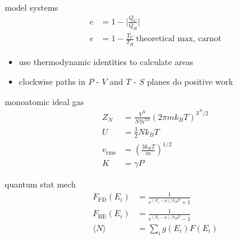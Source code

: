 \documentclass[avery5388, frame, grid]{flashcards}
\begin{document}
\begin{flashcard}{model systems}
  {
    \begin{align*}
      e &= 1 - \lvert \frac{Q_{C}}{Q_{H}} \rvert\\
      e &= 1 - \frac{T_{C}}{T_{H}} \ \textrm{theoretical max, carnot}
    \end{align*}
  }
  \begin{itemize}
    \item use thermodynamic identities to calculate areas
    \item clockwise paths in $P$ - $V$ and $T$ - $S$ planes do positive work
  \end{itemize}
\end{flashcard}

\begin{flashcard}{monoatomic ideal gas}
  {
    \begin{align*}
      Z_{N} &= \frac{V^{N}}{N! h^{3N}}(2 \pi m k_{B} T)^{3^{N}/2}\\
      U &= \frac{3}{2} N k_{B} T\\
      v_{\textrm{rms}} &= (\frac{3 k_{B} T}{m})^{1/2}\\
      K &= \gamma P
    \end{align*}
  }
\end{flashcard}

\begin{flashcard}{quantum stat mech}
  {
    \begin{align*}
      F_{\textrm{FD}}(E_{i}) &= \frac{1}{e^{(E_{i} - \mu) / k_{B} T} + 1}\\
      F_{\textrm{BE}}(E_{i}) &= \frac{1}{e^{(E_{i} - \mu) / k_{B} T} - 1}\\
      \langle N \rangle &= \sum_{i} g(E_{i}) F(E_{i})\\
    \end{align*}
  }
\end{flashcard}
\end{document}
